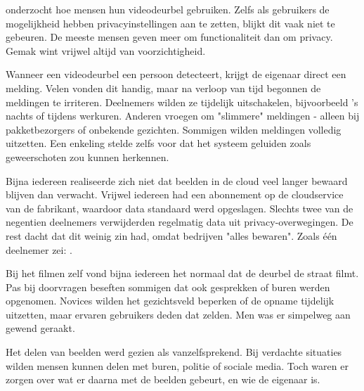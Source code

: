 \documentclass[nonacm, sigconf]{acmart}
\begin{document}


    \parencite{tabassum2023exploring} onderzocht hoe mensen hun videodeurbel gebruiken.
    Zelfs als gebruikers de mogelijkheid hebben privacyinstellingen aan te zetten, blijkt dit vaak niet te gebeuren.
    De meeste mensen geven meer om functionaliteit dan om privacy.
    Gemak wint vrijwel altijd van voorzichtigheid.

    Wanneer een videodeurbel een persoon detecteert, krijgt de eigenaar direct een melding.
    Velen vonden dit handig, maar na verloop van tijd begonnen de meldingen te irriteren.
    Deelnemers wilden ze tijdelijk uitschakelen, bijvoorbeeld 's nachts of tijdens werkuren.
    Anderen vroegen om "slimmere" meldingen - alleen bij pakketbezorgers of onbekende gezichten.
    Sommigen wilden meldingen volledig uitzetten.
    Een enkeling stelde zelfs voor dat het systeem geluiden zoals geweerschoten zou kunnen herkennen.

    Bijna iedereen realiseerde zich niet dat beelden in de cloud veel langer bewaard blijven dan verwacht.
    Vrijwel iedereen had een abonnement op de cloudservice van de fabrikant, waardoor data standaard werd opgeslagen.
    Slechts twee van de negentien deelnemers verwijderden regelmatig data uit privacy-overwegingen.
    De rest dacht dat dit weinig zin had, omdat bedrijven "alles bewaren".
    Zoals één deelnemer zei:
    .

    Bij het filmen zelf vond bijna iedereen het normaal dat de deurbel de straat filmt.
    Pas bij doorvragen beseften sommigen dat ook gesprekken of buren werden opgenomen.
    Novices wilden het gezichtsveld beperken of de opname tijdelijk uitzetten, maar ervaren gebruikers deden dat zelden.
    Men was er simpelweg aan gewend geraakt.

    Het delen van beelden werd gezien als vanzelfsprekend.
    Bij verdachte situaties wilden mensen kunnen delen met buren, politie of sociale media.
    Toch waren er zorgen over wat er daarna met de beelden gebeurt, en wie de eigenaar is.
\end{document}
